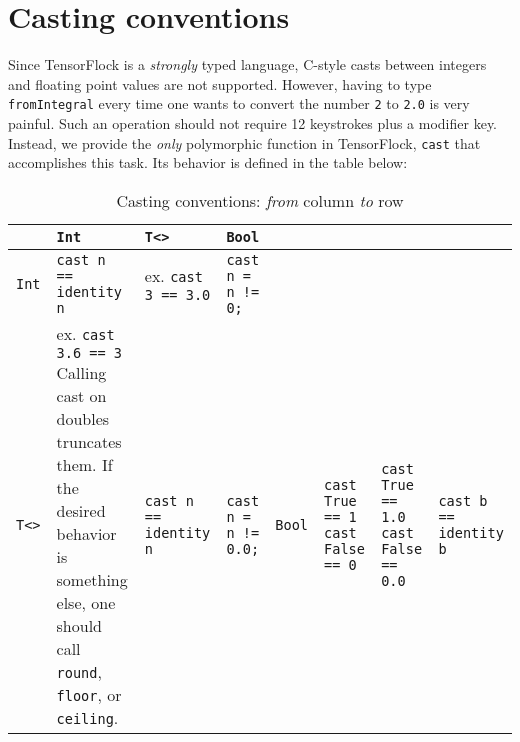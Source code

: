 \section{Casting conventions}%
\label{sec:casting_conventions}

Since TensorFlock is a \emph{strongly} typed language, C-style casts between
integers and floating point values are not supported. However, having to type
\verb|fromIntegral| every time one wants to convert the number \verb|2| to
\verb|2.0| is very painful. Such an operation should not require 12 keystrokes
plus a modifier key. Instead, we provide the \emph{only} polymorphic function
in TensorFlock, \verb|cast| that accomplishes this task. Its behavior is
defined in the table below:

\begin{table}[ht]
    \centering
    \caption{Casting conventions: \emph{from} column \emph{to} row}
    \label{tab:label}
    \begin{tabular}{|p{.9cm}||p{5.5cm}|p{5cm}|p{4.5cm}|}
        \hline
        & \verb|Int| & \verb|T<>| & \verb|Bool| \\
        \hline
        \verb|Int| & \verb|cast n == identity n|& ex. \verb|cast 3 == 3.0| & 
        \verb|cast n =| \verb|n != 0;| \\ 
        \hline
        \verb|T<>| & ex. \verb|cast 3.6 == 3|
                   \newline Calling cast on doubles truncates them. If the
                   desired behavior is something else, one should call \verb|round|,
                   \verb|floor|, or \verb|ceiling|.  
                   & \verb|cast n == identity n| &
                   \verb|cast n =| \verb|n != 0.0;|&
        \hline
        \verb|Bool| & \verb|cast True  == 1| \newline \verb|cast False == 0| &
                      \verb|cast True  == 1.0| \newline \verb|cast False == 0.0| &
                      \verb|cast b ==| \verb|identity b| \\
        \hline
    \end{tabular}
\end{table}
